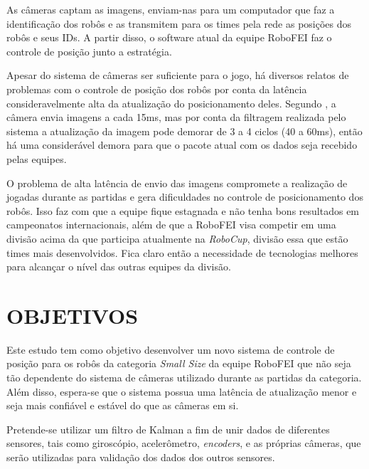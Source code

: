 \documentclass[acronym, symbols]{fei}
\begin{document}

	As câmeras captam as imagens, enviam-nas para um computador que faz a identificação dos robôs e as transmitem para os times pela rede as posições dos robôs e seus IDs. A partir disso, o software atual da equipe RoboFEI faz o controle de posição junto a estratégia. 
	
	Apesar do sistema de câmeras ser suficiente para o jogo, há diversos relatos de problemas com o controle de posição dos robôs por conta da latência consideravelmente alta da atualização do posicionamento deles. Segundo \textcite{tdpZJUNlict2020}, a câmera envia imagens a cada 15ms, mas por conta da filtragem realizada pelo sistema a atualização da imagem pode demorar de 3 a 4 ciclos (40 a 60ms), então há uma considerável demora para que o pacote atual com os dados seja recebido pelas equipes.
	
	O problema de alta latência de envio das imagens compromete a realização de jogadas durante as partidas e gera dificuldades no controle de posicionamento dos robôs. Isso faz com que a equipe fique estagnada e não tenha bons resultados em campeonatos internacionais, além de que a RoboFEI visa competir em uma divisão acima da que participa atualmente na \textit{RoboCup}, divisão essa que estão times mais desenvolvidos. Fica claro então a necessidade de tecnologias melhores para alcançar o nível das outras equipes da divisão.
	
	\section{OBJETIVOS}
	
		Este estudo tem como objetivo desenvolver um novo sistema de controle de posição para os robôs da categoria \textit{Small Size} da equipe RoboFEI que não seja tão dependente do sistema de câmeras utilizado durante as partidas da categoria. Além disso, espera-se que o sistema possua uma latência de atualização menor e seja mais confiável e estável do que as câmeras em si. 
		
		Pretende-se utilizar um filtro de Kalman a fim de unir dados de diferentes sensores, tais como giroscópio, acelerômetro, \textit{encoders}, e as próprias câmeras, que serão utilizadas para validação dos dados dos outros sensores.
		
\end{document}
